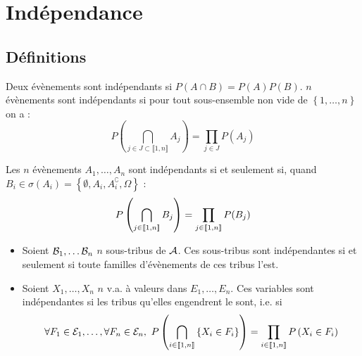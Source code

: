 \documentclass{cours}
\begin{document}
    \section{Indépendance}
        \subsection{Définitions}
            \begin{definition}
                Deux évènements sont indépendants si $P(A\cap B) = P(A)P(B)$. $n$ évènements sont indépendants si pour tout sous-ensemble non vide de $\left\{1, \ldots, n\right\}$ on a :
                \[
                    P\left(\bigcap_{j \in J \subset \llbracket 1, n\rrbracket} A_{j}\right) = \prod_{j \in J} P(A_{j})
                \]
            \end{definition}

            \begin{proposition}
                Les $n$ évènements $A_{1}, \ldots, A_{n}$ sont indépendants si et seulement si, quand $B_{i} \in \sigma\left(A_{i}\right) = \left\{\emptyset, A_{i}, A_{i}^{\complement}, \Omega\right\}$ : 
                \[
                    P\left(\bigcap_{j \in \left\llbracket 1, n\right\rrbracket} B_{j}\right) = \prod_{j \in \left\llbracket 1, n\right\rrbracket} P(B_{j})      
                \]
            \end{proposition}
            
            \begin{definition}
                \begin{itemize}
                    \item Soient $\mathcal{B}_{1}, \ldots \mathcal{B}_{n}$ $n$ sous-tribus de $\mathcal{A}$. Ces sous-tribus sont indépendantes si et seulement si toute familles d'évènements de ces tribus l'est.
                    \item Soient $X_{1}, \ldots, X_{n}$ $n$ v.a. à valeurs dans $E_{1}, \ldots, E_{n}$. Ces variables sont indépendantes si les tribus qu'elles engendrent le sont, i.e. si 
                    \[
                        \forall F_{1} \in \mathcal{E}_{1}, \ldots, \forall F_{n} \in \mathcal{E}_{n}, \ P\left(\bigcap_{i \in \onen{n}}\left\{X_{i} \in F_{i}\right\}\right) = \prod_{i \in \onen{n}} P\left(X_{i} \in F_{i}\right)
                    \]
                \end{itemize}
            \end{definition}
\end{document}
